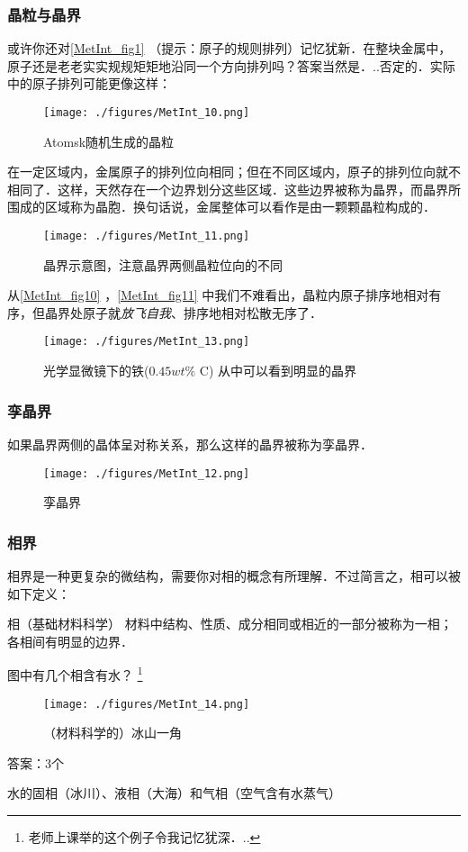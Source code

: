 \subsubsection{晶粒与晶界}
或许你还对\autoref{MetInt_fig1} （提示：原子的规则排列）记忆犹新．在整块金属中，原子还是老老实实规规矩矩地沿同一个方向排列吗？答案当然是．..否定的．实际中的原子排列可能更像这样：
\begin{figure}[ht]
\centering
\texttt{[image: ./figures/MetInt\_10.png]}
\caption{Atomsk随机生成的晶粒} \label{MetInt_fig10}
\end{figure}
在一定区域内，金属原子的排列位向相同；但在不同区域内，原子的排列位向就不相同了．这样，天然存在一个边界划分这些区域．这些边界被称为晶界，而晶界所围成的区域称为晶胞．换句话说，金属整体可以看作是由一颗颗晶粒构成的．
\begin{figure}[ht]
\centering
\texttt{[image: ./figures/MetInt\_11.png]}
\caption{晶界示意图，注意晶界两侧晶粒位向的不同} \label{MetInt_fig11}
\end{figure}
从\autoref{MetInt_fig10} ，\autoref{MetInt_fig11} 中我们不难看出，晶粒内原子排序地相对有序，但晶界处原子就\textsl{放飞自我}、排序地相对松散无序了．

\begin{figure}[ht]
\centering
\texttt{[image: ./figures/MetInt\_13.png]}
\caption{光学显微镜下的铁($0.45 wt\%$ C) 从中可以看到明显的晶界} \label{MetInt_fig13}
\end{figure}

\subsubsection{孪晶界}
如果晶界两侧的晶体呈对称关系，那么这样的晶界被称为孪晶界．
\begin{figure}[ht]
\centering
\texttt{[image: ./figures/MetInt\_12.png]}
\caption{孪晶界} \label{MetInt_fig12}
\end{figure}

\subsubsection{相界}
相界是一种更复杂的微结构，需要你对相的概念有所理解．不过简言之，相可以被如下定义：
\begin{definition}{相（基础材料科学）}
材料中结构、性质、成分相同或相近的一部分被称为一相；各相间有明显的边界．
\end{definition}

\begin{example}{图中有几个相含有水？}
\footnote{老师上课举的这个例子令我记忆犹深．..}
\begin{figure}[ht]
\centering
\texttt{[image: ./figures/MetInt\_14.png]}
\caption{（材料科学的）冰山一角} \label{MetInt_fig14}
\end{figure}
答案：3个

水的固相（冰川）、液相（大海）和气相（空气含有水蒸气）
\end{example}

